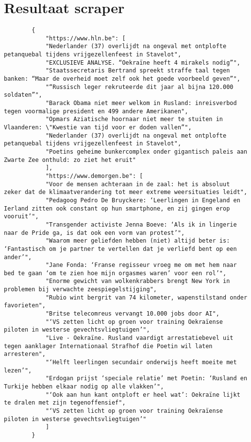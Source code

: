 \section{Resultaat scraper}
\begin{listing}
    \label{bijlage:json-input}
    \begin{verbatim}
        {
            "https://www.hln.be": [
            "Nederlander (37) overlijdt na ongeval met ontplofte petanquebal tijdens vrijgezellenfeest in Stavelot",
            "EXCLUSIEVE ANALYSE. “Oekraïne heeft 4 mirakels nodig”",
            "Staatssecretaris Bertrand spreekt straffe taal tegen banken: “Maar de overheid moet zelf ook het goede voorbeeld geven”",
            "“Russisch leger rekruteerde dit jaar al bijna 120.000 soldaten”",
            "Barack Obama niet meer welkom in Rusland: inreisverbod tegen voormalige president en 499 andere Amerikanen",
            "Opmars Aziatische hoornaar niet meer te stuiten in Vlaanderen: \"Kwestie van tijd voor er doden vallen”",
            "Nederlander (37) overlijdt na ongeval met ontplofte petanquebal tijdens vrijgezellenfeest in Stavelot",
            "Poetins geheime bunkercomplex onder gigantisch paleis aan Zwarte Zee onthuld: zo ziet het eruit"
            ],
            "https://www.demorgen.be": [
            "Voor de mensen achteraan in de zaal: het is absoluut zeker dat de klimaatverandering tot meer extreme weersituaties leidt",
            "Pedagoog Pedro De Bruyckere: ‘Leerlingen in Engeland en Ierland zitten ook constant op hun smartphone, en zij gingen erop vooruit’",
            "Transgender activiste Jenna Boeve: ‘Als ik in lingerie naar de Pride ga, is dat ook een vorm van protest’",
            "Waarom meer geliefden hebben (niet) altijd beter is: ‘Fantastisch om je partner te vertellen dat je verliefd bent op een ander’",
            "Jane Fonda: ‘Franse regisseur vroeg me om met hem naar bed te gaan ‘om te zien hoe mijn orgasmes waren’ voor een rol’",
            "Enorme gewicht van wolkenkrabbers brengt New York in problemen bij verwachte zeespiegelstijging",
            "Rubio wint bergrit van 74 kilometer, wapenstilstand onder favorieten",
            "Britse telecomreus vervangt 10.000 jobs door AI",
            "‘VS zetten licht op groen voor training Oekraïense piloten in westerse gevechtsvliegtuigen’",
            "Live - Oekraïne. Rusland vaardigt arrestatiebevel uit tegen aanklager Internationaal Strafhof die Poetin wil laten arresteren",
            "‘Helft leerlingen secundair onderwijs heeft moeite met lezen’",
            "Erdogan prijst ‘speciale relatie’ met Poetin: ‘Rusland en Turkije hebben elkaar nodig op alle vlakken’",
            "‘Ook aan hun kant ontploft er heel wat’: Oekraïne lijkt te dralen met zijn tegenoffensief",
            "‘VS zetten licht op groen voor training Oekraïense piloten in westerse gevechtsvliegtuigen’"
            ]
        }
        
    \end{verbatim}
\end{listing}
\pagebreak


